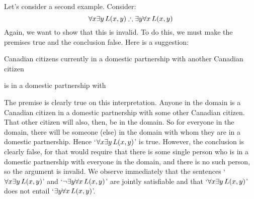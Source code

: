Let's consider a second example. Consider:
$$\forall x \exists y\, \atom{L}{x,y} \therefore \exists y \forall x\, \atom{L}{x,y}$$
Again, we want to show that this is invalid. To do this, we must make the premises true and the conclusion false. Here is a suggestion:
\begin{ekey}
	\item[\text{domain}] Canadian citizens currently in a domestic partnership with another Canadian citizen
	\item[\atom{L}{x,y}]  is in a domestic partnership with 
\end{ekey}
The premise is clearly true on this interpretation. Anyone in the domain is a Canadian citizen in a domestic partnership with some other Canadian citizen. That other citizen will also, then, be in the domain. So for everyone in the domain, there will be someone (else) in the domain with whom they are in a domestic partnership. Hence `$\forall x \exists y\, \mathord{L}(x,y)$' is true. However, the conclusion is clearly false, for that would require that there is some single person who is in a domestic partnership with everyone in the domain, and there is no such person, so the argument is invalid. We observe immediately that the sentences `$\forall x \exists y\, \mathord{L}(x,y)$' and `$\neg\exists y \forall x\, \mathord{L}(x,y)$' are jointly satisfiable and that `$\forall x \exists y\, \mathord{L}(x,y)$' does not entail `$\exists y \forall x\, \mathord{L}(x,y)$'.


